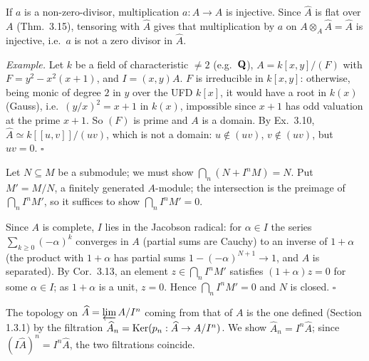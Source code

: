 \documentclass[11pt]{article}
\begin{document}
\pf
If $a$ is a non-zero-divisor, multiplication $a:A\to A$ is injective. Since $\widehat{A}$ is flat over $A$ (Thm.~3.15), tensoring with $\widehat{A}$ gives that multiplication by $a$ on $A\otimes_A\widehat{A}=\widehat{A}$ is injective, i.e.\ $a$ is not a zero divisor in $\widehat{A}$.

\emph{Example.} Let $k$ be a field of characteristic $\ne2$ (e.g.\ $\mathbf Q$), $A=k[x,y]/(F)$ with $F=y^2-x^2(x+1)$, and $I=(x,y)A$. $F$ is irreducible in $k[x,y]$: otherwise, being monic of degree $2$ in $y$ over the UFD $k[x]$, it would have a root in $k(x)$ (Gauss), i.e.\ $(y/x)^2=x+1$ in $k(x)$, impossible since $x+1$ has odd valuation at the prime $x+1$. So $(F)$ is prime and $A$ is a domain. By Ex.~3.10, $\widehat{A}\simeq k[[u,v]]/(uv)$, which is not a domain: $u\notin(uv)$, $v\notin(uv)$, but $uv=0$. \hfill$\square$

\pf
Let $N\subseteq M$ be a submodule; we must show $\bigcap_n(N+I^nM)=N$. Put $M'=M/N$, a finitely generated $A$-module; the intersection is the preimage of $\bigcap_nI^nM'$, so it suffices to show $\bigcap_nI^nM'=0$.

Since $A$ is complete, $I$ lies in the Jacobson radical: for $\alpha\in I$ the series $\sum_{k\ge0}(-\alpha)^k$ converges in $A$ (partial sums are Cauchy) to an inverse of $1+\alpha$ (the product with $1+\alpha$ has partial sums $1-(-\alpha)^{N+1}\to1$, and $A$ is separated). By Cor.~3.13, an element $z\in\bigcap_nI^nM'$ satisfies $(1+\alpha)z=0$ for some $\alpha\in I$; as $1+\alpha$ is a unit, $z=0$. Hence $\bigcap_nI^nM'=0$ and $N$ is closed. \hfill$\square$

\pf
The topology on $\widehat{A}=\varprojlim A/I^n$ coming from that of $A$ is the one defined (Section 1.3.1) by the filtration $\widehat{A}_n=\operatorname{Ker}(p_n:\widehat{A}\to A/I^n)$. We show $\widehat{A}_n=I^n\widehat{A}$; since $(I\widehat{A})^n=I^n\widehat{A}$, the two filtrations coincide.
\end{document}
